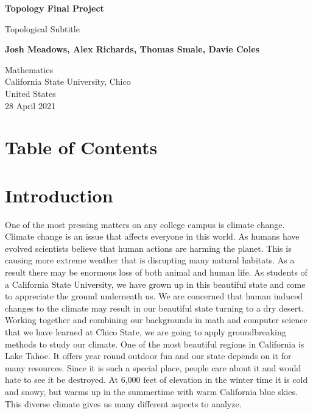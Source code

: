 \documentclass[12pt]{report}
\begin{document}
\begin{titlepage}
   \begin{center}
       \vspace*{1cm}

       \textbf{Topology Final Project}

       \vspace{0.5cm}
        Topological Subtitle
            
       \vspace{1.5cm}

       \textbf{Josh Meadows, Alex Richards, Thomas Smale, Davie Coles}

       \vfill
            
       
            
       \vspace{0.8cm}
            
       Mathematics\\
       California State University, Chico\\
       United States\\
       28 April 2021
            
   \end{center}
\end{titlepage}

\section*{Table of Contents}

\clearpage
\section*{Introduction}


One of the most pressing matters on any college campus is climate change. Climate change is an issue that affects everyone in this world. As humans have evolved scientists believe that human actions are harming the planet. This is causing more extreme weather that is disrupting many natural habitats. As a result there may be enormous loss of both animal and human life. As students of a California State University, we have grown up in this beautiful state and come to appreciate the ground underneath us. We are concerned that human induced changes to the climate may result in our beautiful state turning to a dry desert. Working together and combining our backgrounds in math and computer science that we have learned at Chico State, we are going to apply groundbreaking methods to study our climate. One of the most beautiful regions in California is Lake Tahoe. It offers year round outdoor fun and our state depends on it for many resources. Since it is such a special place, people care about it and would hate to see it be destroyed. At 6,000 feet of elevation in the winter time it is cold and snowy, but warms up in the summertime with warm California blue skies. This diverse climate gives us many different aspects to analyze. 
\end{document}
